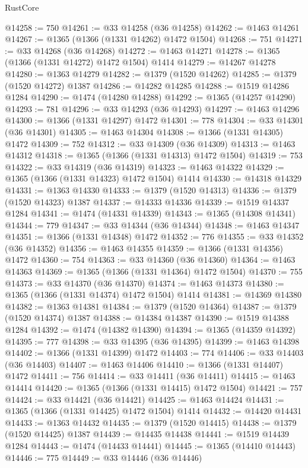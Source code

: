 \begin{lexlean}{RustCore}
\begin{coremodule}
@14258 := 750
@14261 := @33 @14258 (@36 @14258)
@14262 := @1463 @14261
@14267 := @1365 (@1366 (@1331 @14262) @1472 @1504)
@14268 := 751
@14271 := @33 @14268 (@36 @14268)
@14272 := @1463 @14271
@14278 := @1365 (@1366 (@1331 @14272) @1472 @1504) @1414
@14279 := @14267 @14278
@14280 := @1363 @14279
@14282 := @1379 (@1520 @14262)
@14285 := @1379 (@1520 @14272) @1387
@14286 := @14282 @14285
@14288 := @1519 @14286 @1284
@14290 := @1474 (@14280 @14288)
@14292 := @1365 (@14257 @14290)
@14293 := 781
@14296 := @33 @14293 (@36 @14293)
@14297 := @1463 @14296
@14300 := @1366 (@1331 @14297) @1472
@14301 := 778
@14304 := @33 @14301 (@36 @14301)
@14305 := @1463 @14304
@14308 := @1366 (@1331 @14305) @1472
@14309 := 752
@14312 := @33 @14309 (@36 @14309)
@14313 := @1463 @14312
@14318 := @1365 (@1366 (@1331 @14313) @1472 @1504)
@14319 := 753
@14322 := @33 @14319 (@36 @14319)
@14323 := @1463 @14322
@14329 := @1365 (@1366 (@1331 @14323) @1472 @1504) @1414
@14330 := @14318 @14329
@14331 := @1363 @14330
@14333 := @1379 (@1520 @14313)
@14336 := @1379 (@1520 @14323) @1387
@14337 := @14333 @14336
@14339 := @1519 @14337 @1284
@14341 := @1474 (@14331 @14339)
@14343 := @1365 (@14308 @14341)
@14344 := 779
@14347 := @33 @14344 (@36 @14344)
@14348 := @1463 @14347
@14351 := @1366 (@1331 @14348) @1472
@14352 := 776
@14355 := @33 @14352 (@36 @14352)
@14356 := @1463 @14355
@14359 := @1366 (@1331 @14356) @1472
@14360 := 754
@14363 := @33 @14360 (@36 @14360)
@14364 := @1463 @14363
@14369 := @1365 (@1366 (@1331 @14364) @1472 @1504)
@14370 := 755
@14373 := @33 @14370 (@36 @14370)
@14374 := @1463 @14373
@14380 := @1365 (@1366 (@1331 @14374) @1472 @1504) @1414
@14381 := @14369 @14380
@14382 := @1363 @14381
@14384 := @1379 (@1520 @14364)
@14387 := @1379 (@1520 @14374) @1387
@14388 := @14384 @14387
@14390 := @1519 @14388 @1284
@14392 := @1474 (@14382 @14390)
@14394 := @1365 (@14359 @14392)
@14395 := 777
@14398 := @33 @14395 (@36 @14395)
@14399 := @1463 @14398
@14402 := @1366 (@1331 @14399) @1472
@14403 := 774
@14406 := @33 @14403 (@36 @14403)
@14407 := @1463 @14406
@14410 := @1366 (@1331 @14407) @1472
@14411 := 756
@14414 := @33 @14411 (@36 @14411)
@14415 := @1463 @14414
@14420 := @1365 (@1366 (@1331 @14415) @1472 @1504)
@14421 := 757
@14424 := @33 @14421 (@36 @14421)
@14425 := @1463 @14424
@14431 := @1365 (@1366 (@1331 @14425) @1472 @1504) @1414
@14432 := @14420 @14431
@14433 := @1363 @14432
@14435 := @1379 (@1520 @14415)
@14438 := @1379 (@1520 @14425) @1387
@14439 := @14435 @14438
@14441 := @1519 @14439 @1284
@14443 := @1474 (@14433 @14441)
@14445 := @1365 (@14410 @14443)
@14446 := 775
@14449 := @33 @14446 (@36 @14446)

\end{coremodule}
\end{lexlean}

